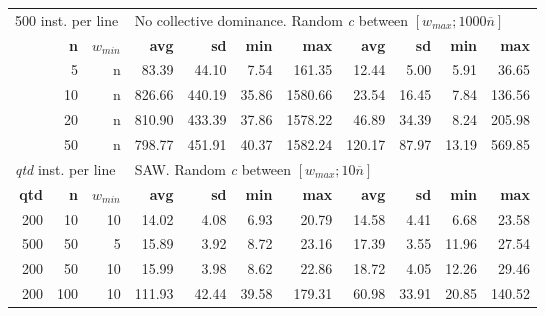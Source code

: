\documentclass[runningheads,a4paper]{llncs}
\begin{document}
\begin{table}
\begin{tabular}{@{\extracolsep{4pt}}rrrrrrrrrrr@{}}
\hline

\multicolumn{3}{l}{500 inst. per line} & \multicolumn{8}{l}{No collective dominance. Random \emph{c} between \([w_{max}; 1000\overline{n}]\)}\\
\cline{1-3}\cline{4-11}
& \textbf{n} & \(w_{min}\) & \textbf{avg} & \textbf{sd} & \textbf{min} & \textbf{max} & \textbf{avg} & \textbf{sd} & \textbf{min} & \textbf{max}\\
\cline{1-3}\cline{4-7}\cline{8-11}
&  5 & n & 83.39 & 44.10 & 7.54 & 161.35 & 12.44 & 5.00 & 5.91 & 36.65\\
& 10 & n & 826.66 & 440.19 & 35.86 & 1580.66 & 23.54 & 16.45 & 7.84 & 136.56\\
& 20 & n & 810.90 & 433.39 & 37.86 & 1578.22 & 46.89 & 34.39 & 8.24 & 205.98\\
& 50 & n & 798.77 & 451.91 & 40.37 & 1582.24 & 120.17 & 87.97 & 13.19 & 569.85\\

\hline

\multicolumn{3}{l}{\emph{qtd} inst. per line} & \multicolumn{8}{l}{SAW. Random \emph{c} between \([w_{max}; 10\overline{n}]\)}\\
\cline{1-3}\cline{4-11}
\textbf{qtd} & \textbf{n} & \(w_{min}\) & \textbf{avg} & \textbf{sd} & \textbf{min} & \textbf{max} & \textbf{avg} & \textbf{sd} & \textbf{min} & \textbf{max}\\
\cline{1-3}\cline{4-7}\cline{8-11}
~200 &  10 & 10 & 14.02 & 4.08 & 6.93 & 20.79 & 14.58 & 4.41 & 6.68 & 23.58\\
~500 &  50 &  5 & 15.89 & 3.92 & 8.72 & 23.16 & 17.39 & 3.55 & 11.96 & 27.54\\
~200 &  50 & 10 & 15.99 & 3.98 & 8.62 & 22.86 & 18.72 & 4.05 & 12.26 & 29.46\\
~200 & 100 & 10 & 111.93 & 42.44 & 39.58 & 179.31 & 60.98 & 33.91 & 20.85 & 140.52\\
\hline

\end{tabular}
\end{table}



\end{document}
